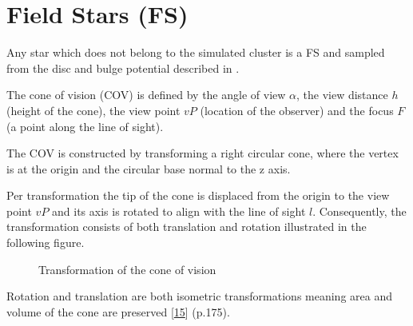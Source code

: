 \documentclass[letterpaper,10pt,english]{sphinxmanual}
\begin{document}
\section{Field Stars (FS)}
\label{\detokenize{NBodySimulation/Initialization:field-stars-fs}}
\sphinxAtStartPar
Any star which does not belong to the simulated cluster is a FS and sampled from the disc and bulge potential described in {\hyperref[\detokenize{NBodySimulation/Potential:galactic-potential-label}]{}}.

\sphinxAtStartPar
The cone of vision (COV) is defined by the angle of view \(\alpha\), the view distance \(h\) (height of the cone), the view point \(vP\) (location of the observer) and the focus \(F\) (a point along the line of sight).

\sphinxAtStartPar
The COV is constructed by transforming a right circular cone, where the vertex is at the origin and the circular base normal to the z axis.

\sphinxAtStartPar
Per transformation the tip of the cone is displaced from the origin to the view point \(vP\) and its axis is rotated to align with the line of sight \(l\).
Consequently, the transformation consists of both translation and rotation illustrated in the following figure.

\begin{figure}[htbp]
\centering
\capstart

\noindent{}
\caption{Transformation of the cone of vision}\label{\detokenize{NBodySimulation/Initialization:id42}}\label{\detokenize{NBodySimulation/Initialization:fig-cone}}\end{figure}

\sphinxAtStartPar
Rotation and translation are both isometric transformations meaning area and volume of the cone are preserved {[}\hyperlink{cite.NBodySimulation/Appendix:id9}{15}{]} (p.175).
\end{document}
